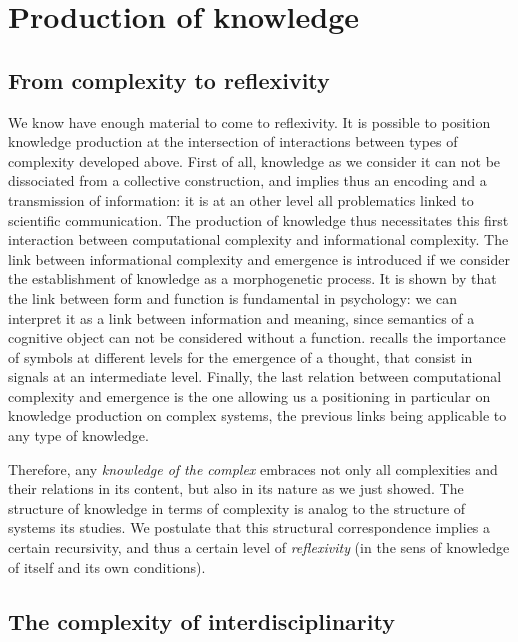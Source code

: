 \section{Production of knowledge}

\subsection{From complexity to reflexivity}

We know have enough material to come to reflexivity. It is possible to position knowledge production at the intersection of interactions between types of complexity developed above. First of all, knowledge as we consider it can not be dissociated from a collective construction, and implies thus an encoding and a transmission of information: it is at an other level all problematics linked to scientific communication. The production of knowledge thus necessitates this first interaction between computational complexity and informational complexity. The link between informational complexity and emergence is introduced if we consider the establishment of knowledge as a morphogenetic process. It is shown by \cite{antelope2016interdisciplinary} that the link between form and function is fundamental in psychology: we can interpret it as a link between information and meaning, since semantics of a cognitive object can not be considered without a function. \cite{hofstadter1980godel} recalls the importance of symbols at different levels for the emergence of a thought, that consist in signals at an intermediate level. Finally, the last relation between computational complexity and emergence is the one allowing us a positioning in particular on knowledge production on complex systems, the previous links being applicable to any type of knowledge.

Therefore, any \emph{knowledge of the complex} embraces not only all complexities and their relations in its content, but also in its nature as we just showed. The structure of knowledge in terms of complexity is analog to the structure of systems its studies. We postulate that this structural correspondence implies a certain recursivity, and thus a certain level of \emph{reflexivity} (in the sens of knowledge of itself and its own conditions).


\subsection{The complexity of interdisciplinarity}


